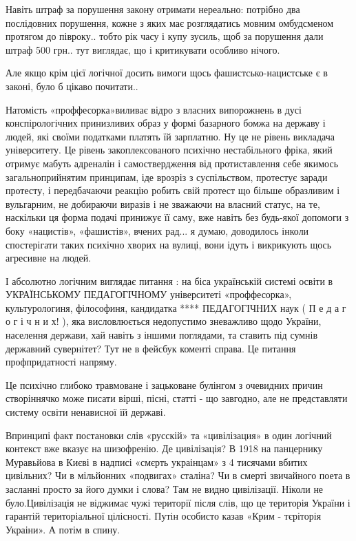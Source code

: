 \begin{itemize}
Навіть штраф за порушення закону отримати нереально: потрібно два послідовних
порушення, кожне з яких має розглядатись мовним омбудсменом протягом до
півроку.. тобто рік часу і купу зусиль, щоб за порушення дали штраф 500 грн..
тут виглядає, що і критикувати особливо нічого.

Але якщо крім цієї логічної досить вимоги щось фашистсько-нацистське є в
законі, було б цікаво почитати..

Натомість «проффесорка»виливає відро з власних випорожнень в дусі
конспірологічних принизливих образ у формі базарного бомжа на державу і людей,
які своїми податками платять їй зарплатню. Ну це не рівень викладача
університету. Це рівень закоплексованого психічно нестабільного фріка, який
отримує мабуть адреналін і самоствердження від протиставлення себе якимось
загальноприйнятим принципам, іде врозріз з суспільством, протестує заради
протесту, і передбачаючи реакцію робить свій протест що більше образливим і
вульгарним, не добираючи виразів і не зважаючи на власний статус, на те,
наскільки ця форма подачі принижує її саму, вже навіть без будь-якої допомоги з
боку «нацистів», «фашистів», вчених рад... я думаю, доводилось інколи
спостерігати таких психічно хворих на вулиці, вони ідуть і викрикують щось
агресивне на людей.

І абсолютно логічним виглядає питання : на біса українській системі освіти в
УКРАЇНСЬКОМУ ПЕДАГОГІЧНОМУ університеті «проффесорка», культурологиня,
філософиня, кандидатка **** ПЕДАГОГІЧНИХ наук ( П е д а г о г і ч н и х! ), яка
висловлюється недопустимо зневажливо щодо України, населення держави, хай
навіть з іншими поглядами, та ставить під сумнів державний сувернітет? Тут не в
фейсбук коменті справа. 
Це питання профпридатності напряму.

Це психічно глибоко травмоване і зацьковане булінгом з очевидних причин
створіннячко може писати вірші, пісні, статті - що завгодно, але не
представляти систему освіти ненависної їй державі.

Впринципі факт постановки слів «русскій» та «цивілізация» в один логічний
контекст вже вказує на шизофренію. Де цивілізація? В 1918 на панцернику
Муравьйова в Києві в надписі «смєрть украінцам» з 4 тисячами вбитих цивільних?
Чи в мільйонних «подвигах» сталіна? Чи в смерті звичайного поета в засланні
просто за його думки і слова? Там не видно цивілізації. Ніколи не
було.Цивілізація не віджимає чужі території після слів, що це територія України
і гарантій територіальної цілісності. Путін особисто казав «Крим - тєріторія
Украіни». А потім в спину.


\end{itemize}
